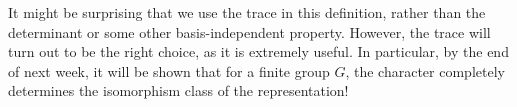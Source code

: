 It might be surprising that we use the trace in this definition, rather than the determinant or some other basis-independent property. However, the trace will turn out to be the right choice, as it is extremely useful. In particular, by the end of next week, it will be shown that for a finite group $G$, the character completely determines the isomorphism class of the representation!

